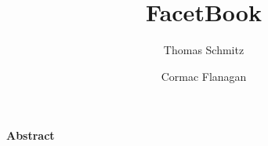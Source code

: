 



\title{FacetBook}
\author{Thomas Schmitz \and{} Cormac Flanagan}
\maketitle

\noindent
\textbf{Abstract}






